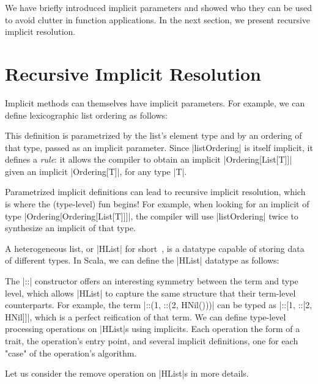 
We have briefly introduced implicit parameters and showed who they can be used to avoid clutter in function applications.
In the next section, we present recursive implicit resolution.

\section{Recursive Implicit Resolution}

Implicit methods can themselves have implicit parameters.
For example, we can define lexicographic list ordering as follows:

\ordListExampleCodeSection

\noindent
This definition is parametrized by the list's element type and by an ordering of that type, passed as an implicit parameter.
Since |listOrdering| is itself implicit, it defines a \emph{rule}: it allows the compiler to obtain an implicit |Ordering[List[T]]| given an implicit |Ordering[T]|, for any type |T|.

Parametrized implicit definitions can lead to recursive implicit resolution, which is where the (type-level) fun begins!
For example, when looking for an implicit of type |Ordering[Ordering[List[T]]]|, the compiler will use |listOrdering| twice to synthesize an implicit of that type.

A heterogeneous list, or |HList| for short~\citep{kiselyov2004strongly}, is a datatype capable of storing data of different types.
In Scala, we can define the |HList| datatype as follows:

\hlistEnumDefinitionCodeSection

The |::| constructor offers an interesting symmetry between the term and type level, which allows |HList| to capture the same structure that their term-level counterparts.
For example, the term |::(1, ::(2, HNil()))| can be typed as |::[1, ::[2, HNil]]|, which is a perfect reification of that term.
We can define type-level processing operations on |HList|s using implicits.
Each operation the form of a trait, the operation's entry point, and several implicit definitions, one for each "case" of the operation's algorithm.

Let us consider the remove operation on |HList|s in more details.

\memImplicitRemoveCodeSection

